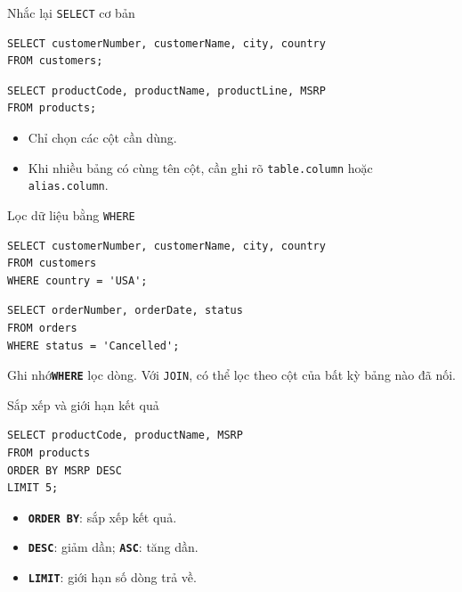 \documentclass[aspectratio=169,11pt]{beamer}
\newcommand{\kw}[1]{\textbf{\texttt{#1}}}
\newcommand{\hint}[1]{\begin{block}{Ghi nhớ}#1\end{block}}
\begin{document}
\begin{frame}[fragile]{Nhắc lại \texttt{SELECT} cơ bản}
\begin{lstlisting}
SELECT customerNumber, customerName, city, country
FROM customers;
\end{lstlisting}
\begin{lstlisting}
SELECT productCode, productName, productLine, MSRP
FROM products;
\end{lstlisting}
\begin{itemize}
  \item Chỉ chọn các cột cần dùng.
  \item Khi nhiều bảng có cùng tên cột, cần ghi rõ \texttt{table.column} hoặc \texttt{alias.column}.
\end{itemize}
\end{frame}

\begin{frame}[fragile]{Lọc dữ liệu bằng \texttt{WHERE}}
\begin{lstlisting}
SELECT customerNumber, customerName, city, country
FROM customers
WHERE country = 'USA';
\end{lstlisting}
\begin{lstlisting}
SELECT orderNumber, orderDate, status
FROM orders
WHERE status = 'Cancelled';
\end{lstlisting}
\hint{\kw{WHERE} lọc dòng. Với \texttt{JOIN}, có thể lọc theo cột của bất kỳ bảng nào đã nối.}
\end{frame}

\begin{frame}[fragile]{Sắp xếp và giới hạn kết quả}
\begin{lstlisting}
SELECT productCode, productName, MSRP
FROM products
ORDER BY MSRP DESC
LIMIT 5;
\end{lstlisting}
\begin{itemize}
  \item \kw{ORDER BY}: sắp xếp kết quả.
  \item \kw{DESC}: giảm dần; \kw{ASC}: tăng dần.
  \item \kw{LIMIT}: giới hạn số dòng trả về.
\end{itemize}
\end{frame}
\end{document}
